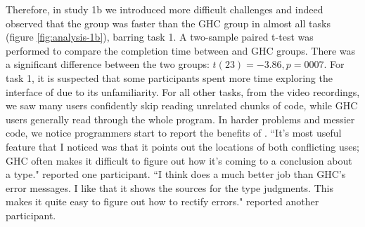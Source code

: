 Therefore, in study 1b we introduced more difficult challenges and indeed observed that the \chameleon{} group was faster than the GHC group in almost all tasks (figure \ref{fig:analysis-1b}), barring task 1. A two-sample paired t-test was performed to compare the completion time between \chameleon{} and GHC groups. There was a significant difference between the two groups: $t(23) = -3.86, p = 0007$. For task 1, it is suspected that some participants spent more time exploring the interface of \chameleon{} due to its unfamiliarity. For all other tasks, from the video recordings, we saw many \chameleon{} users confidently skip reading unrelated chunks of code, while GHC users generally read through the whole program. In harder problems and messier code, we notice programmers start to report the benefits of \chameleon{}. ``It's most useful feature that I noticed was that it points out the locations of both conflicting uses; GHC often makes it difficult to figure out how it's coming to a conclusion about a type." reported one participant. ``I think \chameleon{}  does a much better job than GHC's error messages. I like that it shows the sources for the type judgments. This makes it quite easy to figure out how to rectify errors." reported another participant.



  



